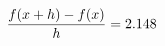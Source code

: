 \documentclass[preview]{standalone}
\begin{document}
\begin{align*}
\special{dvisvgm:raw <g id='unique000'>}\frac{f(x+h)-f(x)}{h} = 2.148\special{dvisvgm:raw </g>}
\end{align*}
\end{document}
